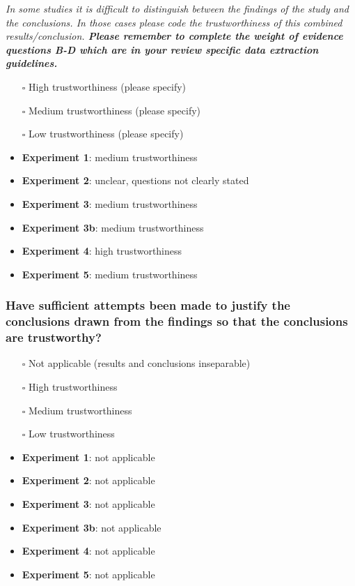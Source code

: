 \documentclass[
  doc, a4paper]{apa7}
\begin{document}
\emph{In some studies it is difficult to distinguish between the findings of the study and the conclusions. In those cases please code the trustworthiness of this combined results/conclusion.\textbf{ Please remember to complete the weight of evidence questions B-D which are in your review specific data extraction guidelines. }}

\begin{itemize}
\item[$\square$]
  High trustworthiness (please specify)
\item[$\square$]
  Medium trustworthiness (please specify)
\item[$\square$]
  Low trustworthiness (please specify)
\item
  \textbf{Experiment 1}: medium trustworthiness
\item
  \textbf{Experiment 2}: unclear, questions not clearly stated
\item
  \textbf{Experiment 3}: medium trustworthiness
\item
  \textbf{Experiment 3b}: medium trustworthiness
\item
  \textbf{Experiment 4}: high trustworthiness
\item
  \textbf{Experiment 5}: medium trustworthiness
\end{itemize}

\subsubsection{Have sufficient attempts been made to justify the conclusions drawn from the findings so that the conclusions are trustworthy?}\label{have-sufficient-attempts-been-made-to-justify-the-conclusions-drawn-from-the-findings-so-that-the-conclusions-are-trustworthy}

\begin{itemize}
\item[$\square$]
  Not applicable (results and conclusions inseparable)
\item[$\square$]
  High trustworthiness
\item[$\square$]
  Medium trustworthiness
\item[$\square$]
  Low trustworthiness
\item
  \textbf{Experiment 1}: not applicable\\
\item
  \textbf{Experiment 2}: not applicable
\item
  \textbf{Experiment 3}: not applicable
\item
  \textbf{Experiment 3b}: not applicable
\item
  \textbf{Experiment 4}: not applicable
\item
  \textbf{Experiment 5}: not applicable
\end{itemize}
\end{document}
